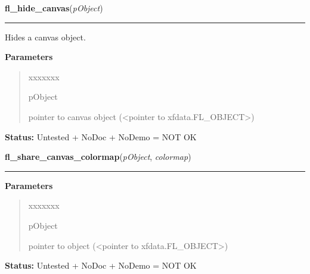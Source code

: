 \hspace{.8\funcindent}\begin{boxedminipage}{\funcwidth}

    \raggedright \textbf{fl\_hide\_canvas}(\textit{pObject})

    \vspace{-1.5ex}

    \rule{\textwidth}{0.5\fboxrule}
\setlength{\parskip}{2ex}
    Hides a canvas object.

\setlength{\parskip}{1ex}
      \textbf{Parameters}
      \vspace{-1ex}

      \begin{quote}
        \begin{Ventry}{xxxxxxx}

          \item[pObject]

          pointer to canvas object ({\textless}pointer to 
          xfdata.FL\_OBJECT{\textgreater})

        \end{Ventry}

      \end{quote}

\textbf{Status:} Untested + NoDoc + NoDemo = NOT OK



    \end{boxedminipage}

    \label{xformslib:library:fl_share_canvas_colormap}

    \vspace{0.5ex}

\hspace{.8\funcindent}\begin{boxedminipage}{\funcwidth}

    \raggedright \textbf{fl\_share\_canvas\_colormap}(\textit{pObject}, \textit{colormap})

    \vspace{-1.5ex}

    \rule{\textwidth}{0.5\fboxrule}
\setlength{\parskip}{2ex}
\setlength{\parskip}{1ex}
      \textbf{Parameters}
      \vspace{-1ex}

      \begin{quote}
        \begin{Ventry}{xxxxxxx}

          \item[pObject]

          pointer to object ({\textless}pointer to 
          xfdata.FL\_OBJECT{\textgreater})

        \end{Ventry}

      \end{quote}

\textbf{Status:} Untested + NoDoc + NoDemo = NOT OK



    \end{boxedminipage}

